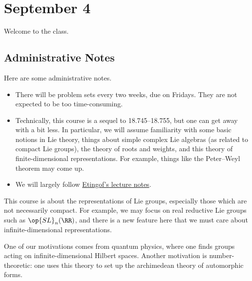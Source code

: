\documentclass[../notes.tex]{subfiles}
\begin{document}
\section{September 4}
Welcome to the class.

\subsection{Administrative Notes}
Here are some administrative notes.
\begin{itemize}
	\item There will be problem sets every two weeks, due on Fridays. They are not expected to be too time-consuming.
	\item Technically, this course is a sequel to 18.745--18.755, but one can get away with a bit less. In particular, we will assume familiarity with some basic notions in Lie theory, things about simple complex Lie algebras (as related to compact Lie groups), the theory of roots and weights, and this theory of finite-dimensional representations. For example, things like the Peter--Weyl theorem may come up.
	\item We will largely follow \href{https://amathr.org/wp-content/uploads/2024/10/Etingofbook2.pdf}{Etingof's lecture notes}.
\end{itemize}
This course is about the representations of Lie groups, especially those which are not necessarily compact. For example, we may focus on real reductive Lie groups such as $\op{SL}_n(\RR)$, and there is a new feature here that we must care about infinite-dimensional representations.

One of our motivations comes from quantum physics, where one finds groups acting on infinite-dimen\-sional Hilbert spaces. Another motivation is number-theoretic: one uses this theory to set up the arch\-imedean theory of automorphic forms.
\end{document}
